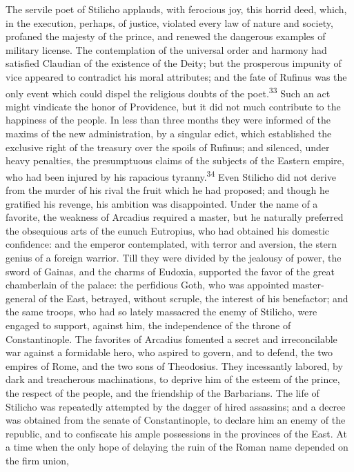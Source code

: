 The servile poet of Stilicho applauds, with ferocious joy, this
horrid deed, which, in the execution, perhaps, of justice,
violated every law of nature and society, profaned the majesty of
the prince, and renewed the dangerous examples of military
license. The contemplation of the universal order and harmony had
satisfied Claudian of the existence of the Deity; but the
prosperous impunity of vice appeared to contradict his moral
attributes; and the fate of Rufinus was the only event which
could dispel the religious doubts of the poet.\textsuperscript{33} Such an act
might vindicate the honor of Providence, but it did not much
contribute to the happiness of the people. In less than three
months they were informed of the maxims of the new
administration, by a singular edict, which established the
exclusive right of the treasury over the spoils of Rufinus; and
silenced, under heavy penalties, the presumptuous claims of the
subjects of the Eastern empire, who had been injured by his
rapacious tyranny.\textsuperscript{34} Even Stilicho did not derive from the
murder of his rival the fruit which he had proposed; and though
he gratified his revenge, his ambition was disappointed. Under
the name of a favorite, the weakness of Arcadius required a
master, but he naturally preferred the obsequious arts of the
eunuch Eutropius, who had obtained his domestic confidence: and
the emperor contemplated, with terror and aversion, the stern
genius of a foreign warrior. Till they were divided by the
jealousy of power, the sword of Gainas, and the charms of
Eudoxia, supported the favor of the great chamberlain of the
palace: the perfidious Goth, who was appointed master-general of
the East, betrayed, without scruple, the interest of his
benefactor; and the same troops, who had so lately massacred the
enemy of Stilicho, were engaged to support, against him, the
independence of the throne of Constantinople. The favorites of
Arcadius fomented a secret and irreconcilable war against a
formidable hero, who aspired to govern, and to defend, the two
empires of Rome, and the two sons of Theodosius. They incessantly
labored, by dark and treacherous machinations, to deprive him of
the esteem of the prince, the respect of the people, and the
friendship of the Barbarians. The life of Stilicho was repeatedly
attempted by the dagger of hired assassins; and a decree was
obtained from the senate of Constantinople, to declare him an
enemy of the republic, and to confiscate his ample possessions in
the provinces of the East. At a time when the only hope of
delaying the ruin of the Roman name depended on the firm union,
